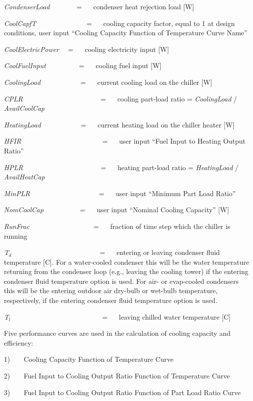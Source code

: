 \emph{CondenserLoad~~~~~~~} = ~~ condenser heat rejection load {[}W{]}

\emph{CoolCapfT}~~~~~~~~~~~~~~ = ~~ cooling capacity factor, equal to 1 at design conditions, user input ``Cooling Capacity Function of Temperature Curve Name''

\emph{CoolElectricPower}~~ = ~~ cooling electricity input {[}W{]}

\emph{CoolFuelInput}~~~~~~~~~ = ~~ cooling fuel input {[}W{]}

\emph{CoolingLoad}~~~~~~~~~~~ = ~~ current cooling load on the chiller {[}W{]}

\emph{CPLR}~~~~~~~~~~~~~~~~~~~~~~ = ~~ cooling part-load ratio = \emph{CoolingLoad} / \emph{AvailCoolCap}

\emph{HeatingLoad}~~~~~~~~~~~ = ~~ current heating load on the chiller heater {[}W{]}

\emph{HFIR}~~~~~~~~~~~~~~~~~~~~~~~ = ~~ user input ``Fuel Input to Heating Output Ratio''

\emph{HPLR}~~~~~~~~~~~~~~~~~~~~~~ = ~~ heating part-load ratio = \emph{HeatingLoad} / \emph{AvailHeatCap}

\emph{MinPLR~~~~~~~~~~~~~~~~~~~} = ~~ user input ``Minimum Part Load Ratio''

\emph{NomCoolCap}~~~~~~~~~~ = ~~ user input ``Nominal Cooling Capacity'' {[}W{]}

\emph{RunFrac}~~~~~~~~~~~~~~~~~~ = ~~ fraction of time step which the chiller is running

\emph{T\(_{d}\)}~~~~~~~~~~~~~~~~~~~~~~~~~ = ~~ entering or leaving condenser fluid temperature {[}C{]}. For a water-cooled condenser this will be the water temperature returning from the condenser loop (e.g., leaving the cooling tower) if the entering condenser fluid temperature option is used. For air- or evap-cooled condensers this will be the entering outdoor air dry-bulb or wet-bulb temperature, respectively, if the entering condenser fluid temperature option is used.

\emph{T\(_{l}\)}~~~~~~~~~~~~~~~~~~~~~~~~~~ = ~~ leaving chilled water temperature {[}C{]}

Five performance curves are used in the calculation of cooling capacity and efficiency:

1)~~~~Cooling Capacity Function of Temperature Curve

2)~~~~Fuel Input to Cooling Output Ratio Function of Temperature Curve

3)~~~~Fuel Input to Cooling Output Ratio Function of Part Load Ratio Curve

